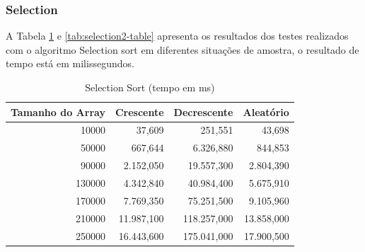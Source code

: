 \documentclass[a4paper, 12pt]{article}
\begin{document}
\subsubsection{Selection}
A Tabela \ref{tab:selection1-table} e \ref{tab:selection2-table}  apresenta os resultados dos testes realizados com o algoritmo Selection sort em diferentes situações de amostra, o resultado de tempo está em milissegundos.
\begin{longtable}[c]{@{}rrrr@{}}
				\caption{Selection Sort (tempo em ms)}
	\label{tab:selection1-table}\\
	\toprule
	\multicolumn{1}{l}{\textbf{Tamanho do Array}} & \multicolumn{1}{c}{\textbf{Crescente}} & \multicolumn{1}{c}{\textbf{Decrescente}} & \multicolumn{1}{c}{\textbf{Aleatório}} \\* \midrule
	\endfirsthead
	\endhead
	\multicolumn{1}{|r|}{10000}                   & \multicolumn{1}{r|}{37,609}            & \multicolumn{1}{r|}{251,551}             & \multicolumn{1}{r|}{43,698}            \\* \midrule
	\multicolumn{1}{|r|}{50000}                   & \multicolumn{1}{r|}{667,644}           & \multicolumn{1}{r|}{6.326,880}           & \multicolumn{1}{r|}{844,853}           \\* \midrule
	\multicolumn{1}{|r|}{90000}                   & \multicolumn{1}{r|}{2.152,050}         & \multicolumn{1}{r|}{19.557,300}          & \multicolumn{1}{r|}{2.804,390}         \\* \midrule
	\multicolumn{1}{|r|}{130000}                  & \multicolumn{1}{r|}{4.342,840}         & \multicolumn{1}{r|}{40.984,400}          & \multicolumn{1}{r|}{5.675,910}         \\* \midrule
	\multicolumn{1}{|r|}{170000}                  & \multicolumn{1}{r|}{7.769,350}         & \multicolumn{1}{r|}{75.251,500}          & \multicolumn{1}{r|}{9.105,960}         \\* \midrule
	\multicolumn{1}{|r|}{210000}                  & \multicolumn{1}{r|}{11.987,100}        & \multicolumn{1}{r|}{118.257,000}         & \multicolumn{1}{r|}{13.858,000}        \\* \midrule
	\multicolumn{1}{|r|}{250000}                  & \multicolumn{1}{r|}{16.443,600}        & \multicolumn{1}{r|}{175.041,000}         & \multicolumn{1}{r|}{17.900,500}        \\* \midrule

\end{longtable}
\end{document}
